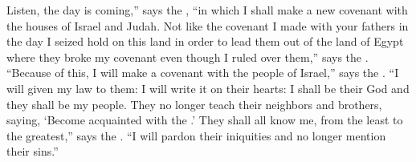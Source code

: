 
\begin{inparaenum}
  
  
  
  
  
  
  
  
   Listen, the day is coming,'' says the \lord, ``in which I shall make a new covenant with the houses of Israel and Judah.%
   Not like the covenant I made with your fathers in the day I seized hold on this land in order to lead them out of the land of Egypt where they broke my covenant even though I ruled over them,'' says the \lord.%
   ``Because of this, I will make a covenant with the people of Israel,'' says the \lord. ``I will given my law to them: I will write it on their hearts: I shall be their God and they shall be my people.%
   They no longer teach their neighbors and brothers, saying, `Become acquainted with the \lord.' They shall all know me, from the least to the greatest,'' says the \lord. ``I will pardon their iniquities and no longer mention their sins.''%
  
  
  
\end{inparaenum}
